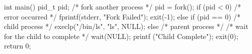 \documentclass[varwidth=22em,crop]{standalone}
\begin{document}
\begin{ccode}
int main()
{
  pid_t pid;
  /* fork another process */
  pid = fork();
  if (pid < 0) { /* error occurred */
    fprintf(stderr, "Fork Failed");
    exit(-1);
  }
  else if (pid == 0) { /* child process */
    execlp("/bin/ls", "ls", NULL);
  }
  else { /* parent process */
    /* wait for the child to complete */
    wait(NULL);
    printf ("Child Complete");
    exit(0);
  }
  return 0;
}  
\end{ccode}
\end{document}

